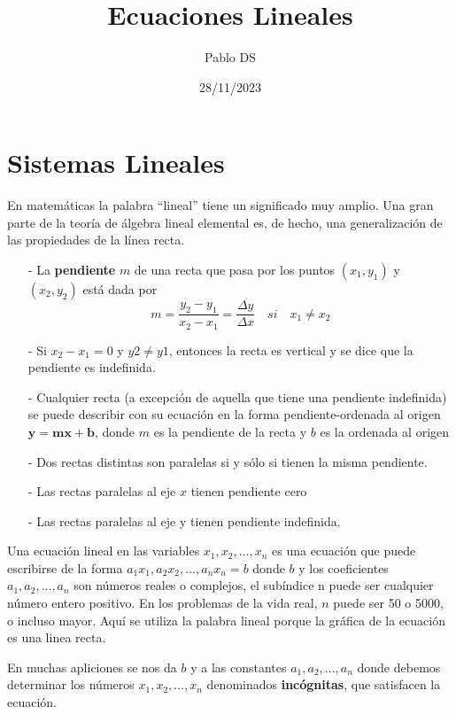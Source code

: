 \documentclass{article}
\title{Ecuaciones Lineales}
\date{28/11/2023}
\author{Pablo DS}
\begin{document}
\maketitle
\section{Sistemas Lineales}

En matemáticas la palabra “lineal” tiene un significado muy amplio. Una gran parte de la teoría de álgebra lineal elemental es, de hecho, una generalización de las propiedades de la línea recta.

\begin{tcolorbox}[colback=green!20!white,colframe=green!80!black,title=Propiedades de la Recta]
    \begin{itemize}
        \item[-] La \textbf{pendiente} $m$ de una recta que pasa por los puntos $(x_1, y_1)$ y $(x_2, y_2)$ está dada por $$m=\frac{y_2-y_1}{x_2-x_1} = \frac{\Delta y}{\Delta x} \quad si \quad x_1 \neq x_2$$
        \item[-] Si $x_2 - x_1 = 0$ y $y2 \neq y1$, entonces la recta es vertical y se dice que la pendiente es indefinida.
        \item[-] Cualquier recta (a excepción de aquella que tiene una pendiente indefinida) se puede describir con su ecuación en la forma pendiente-ordenada al origen $\mathbf{y= mx + b}$, donde $m$ es la pendiente de la recta y $b$ es la ordenada al origen
        \item[-] Dos rectas distintas son paralelas si y sólo si tienen la misma pendiente. 
        \item[-] Las rectas paralelas al eje $x$ tienen pendiente cero
        \item[-] Las rectas paralelas al eje y tienen pendiente indefinida.
    \end{itemize}

\end{tcolorbox}

Una ecuación lineal en las variables $ x_1,x_2,\dots, x_n $ es una ecuación que puede escribirse de la forma $ a_1x_1,a_2x_2,\dots, a_nx_n=b$ donde $b$ y los coeficientes $a_1,a_2,\dots, a_n$ son números reales o complejos, el subíndice n puede ser cualquier número entero positivo. En los problemas de la vida real, $n$ puede ser 50 o 5000, o incluso mayor. Aquí se utiliza la palabra lineal porque la gráfica de la ecuación es una linea recta.

En muchas apliciones se nos da $b$ y a las constantes $ a_1,a_2,\dots, a_n $ donde debemos determinar los números $ x_1,x_2,\dots, x_n $ denominados \textbf{incógnitas}, que satisfacen la ecuación.
\end{document}
